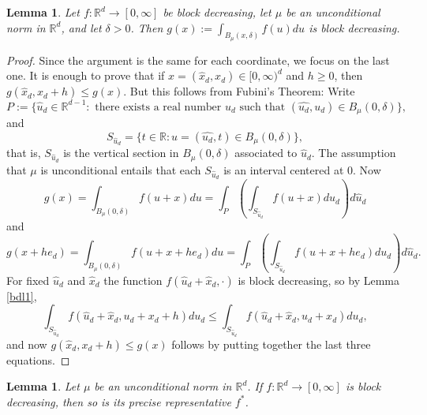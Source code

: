 \documentclass[12pt]{amsart}
\numberwithin{equation}{section}
\theoremstyle{plain}
\newtheorem{lemma}[theorem]{Lemma}
\theoremstyle{definition}
\theoremstyle{remark}
\begin{document}
\begin{lemma}\label{bdl2}
  Let $f:\mathbb{R}^d\rightarrow [0, \infty]$ be  block decreasing,
let $\mu$ be an unconditional norm in $\mathbb{R}^d$, and let $\delta>0$. Then
   $g(x):=\int_{B_\mu(x,\delta)}f(u)du$ is block
  decreasing.
\end{lemma}
\begin{proof} Since the argument is the same for each coordinate, we
focus on  the last one. It is enough to prove that if $x=(\hat{x}_d,x_d)\in [0, \infty)^d$ and   $h\ge0$, then
  $g(\hat{x}_{d},x_d+h)\le g(x)$. But this
follows from Fubini's Theorem: Write
\begin{equation*}
  P:=\{\hat{u}_d\in\mathbb{R}^{d-1}: \mbox{ there exists a real number } u_d \mbox{ such that }(\hat{u_d}, u_d)\in B_\mu(0,\delta)\},
\end{equation*}
and
\begin{equation*}
  S_{\hat{u}_d}=\{t \in \mathbb{R}: u= (\hat{u_d}, t)\in B_\mu(0,\delta)\},
  \end{equation*}
that is, $ S_{\hat{u}_d}$ is the vertical section
in $B_\mu(0,\delta)$ associated to $\hat{u}_d$.
The assumption that $\mu$ is  unconditional entails that each
$S_{\hat{u}_d}$ is an interval centered at 0.
 Now
\begin{equation*}
  g(x)=\int_{B_\mu(0,\delta)}f(u+x)du= \int_P
  \left(\int_{S_{\hat{u}_d}}f(u+x)
  du_d\right)d\hat{u}_d
\end{equation*}
and
\begin{equation*}
  g(x+he_d)=\int_{B_\mu(0,\delta)}f(u+x+he_d)du= \int_P
  \left(\int_{S_{\hat{u}_d}}f(u+x+he_d)
  du_d\right)d\hat{u}_d.
\end{equation*}
For fixed $\hat{u}_d$ and $\hat{x}_d$ the function
$f(\hat{u}_d+\hat{x}_d,\cdot)$ is block decreasing, so by Lemma
\ref{bdl1},
\begin{equation*}
  \int_{S_{\hat{u}_d}}f(\hat{u}_d +\hat{x}_d,u_d+x_d+h)
  du_d \le  \int_{S_{\hat{u}_d}}f(\hat{u}_d +\hat{x}_d,u_d+x_d)
  du_d,
\end{equation*}
and now $g(\hat{x}_{d},x_d+h)\le g(x)$ follows by putting together the last three equations.
\end{proof}

\begin{lemma}\label{precrep} Let $\mu$ be an unconditional norm in $\mathbb{R}^d$.
  If $f:\mathbb{R}^d\rightarrow [0, \infty]$ is  block decreasing,
  then so is its precise representative $f^*$.
  \end{lemma}
\end{document}
